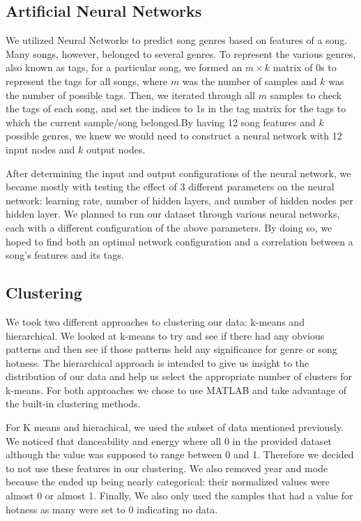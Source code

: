 \documentclass[12pt]{article}
\begin{document}
\subsection{Artificial Neural Networks}
\label{subsec:ann}
We utilized Neural Networks to predict song genres based on features of a song. Many songs, however, belonged to several genres. To represent the various genres, also known as tags, for a particular song, we formed an $m \times k$ matrix of 0s to represent the tags for all songs, where $m$ was the number of samples and $k$ was the number of possible tags. Then, we iterated through all $m$ samples to check the tags of each song, and set the indices to 1s in the tag matrix for the tags to which the current sample/song belonged.By having 12 song features and $k$ possible genres, we knew we would need to construct a neural network with 12 input nodes and $k$ output nodes. 

After determining the input and output configurations of the neural network, we became mostly with testing the effect of 3 different parameters on the neural network: learning rate, number of hidden layers, and number of hidden nodes per hidden layer. We planned to run our dataset through various neural networks, each with a different configuration of the above parameters. By doing so, we hoped to find both an optimal network configuration and a correlation between a song's features and its tags. 
\subsection{Clustering}
\label{subsec:clustering}
We took two different approaches to clustering our data: k-means and hierarchical. We looked at k-means to try and see if there had any obvious patterns and then see if those patterns held any significance for genre or song hotness. The hierarchical approach is intended to give us insight to the distribution of our data and help us select the appropriate number of clusters for k-means. For both approaches we chose to use MATLAB and take advantage of the built-in clustering methods.

For K means and hierachical, we used the subset of data mentioned previously. We noticed that danceability and energy where all 0 in the provided dataset although the value was supposed to range between 0 and 1. Therefore we decided to not use these features in our clustering. We also removed year and mode because the ended up being nearly categorical: their normalized values were almost 0 or almost 1. Finally, We also only used the samples that had a value for hotness as many were set to 0 indicating no data. 
\end{document}
